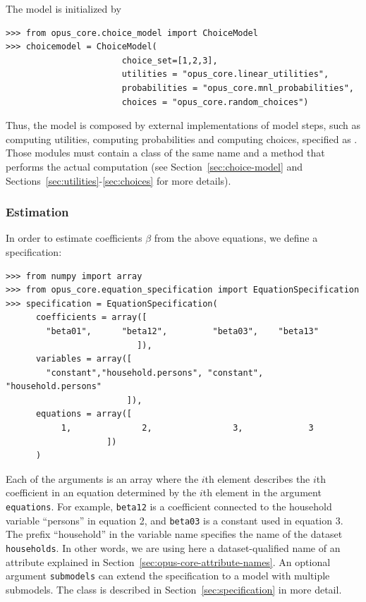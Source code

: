 The model is initialized by
\begin{verbatim}
>>> from opus_core.choice_model import ChoiceModel
>>> choicemodel = ChoiceModel(
                       choice_set=[1,2,3],
                       utilities = "opus_core.linear_utilities",
                       probabilities = "opus_core.mnl_probabilities",
                       choices = "opus_core.random_choices")
\end{verbatim}
Thus, the model is composed by external implementations of model steps, such
as computing utilities, computing probabilities and computing choices,
specified as . Those modules must contain a
class of the same name and a method  that performs the actual
computation (see Section~\ref{sec:choice-model} and Sections~\ref{sec:utilities}-\ref{sec:choices}
for more details).

%
\subsubsection{Estimation}
%
In order to estimate coefficients \coefficientsindex $\beta$ from the above equations, we define
a specification:

\coefficientsindex \variablesindex
\begin{verbatim}
>>> from numpy import array
>>> from opus_core.equation_specification import EquationSpecification
>>> specification = EquationSpecification(
      coefficients = array([
        "beta01",      "beta12",         "beta03",    "beta13"
                          ]),
      variables = array([
        "constant","household.persons", "constant", "household.persons"
                        ]),
      equations = array([
           1,              2,                3,             3
                    ])
      )
\end{verbatim}
Each of the arguments is an array where the $i$th element describes the $i$th
coefficient \coefficientsindex in an equation determined by the $i$th element in the argument
\verb|equations|. For example, \verb|beta12| is a coefficient \coefficientsindex connected to the
household variable \variablesindex ``persons'' in equation 2, and \verb|beta03| is a constant
used in equation 3. The prefix ``household'' in the variable \variablesindex name specifies
the name of the dataset \datasetindex \verb|households|.
In other words, we are using here a dataset-qualified \datasetindex name of an attribute \attributesindex explained in
Section~\ref{sec:opus-core-attribute-names}.
An optional argument \verb|submodels| can extend the specification
to a model with multiple submodels. The  class is described
in Section~\ref{sec:specification} in more detail.


